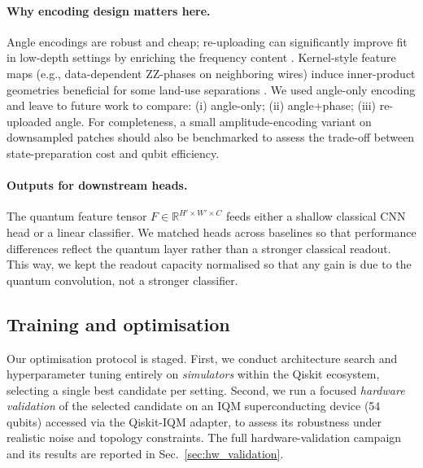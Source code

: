\paragraph{Why encoding design matters here.}
Angle encodings are robust and cheap; re-uploading can significantly improve fit in low-depth settings by enriching the frequency content \cite{PerezSalinas2020,Schuld2020Expressivity}. Kernel-style feature maps (e.g., data-dependent ZZ-phases on neighboring wires) induce inner-product geometries beneficial for some land-use separations \cite{Havlicek2019}. We used angle-only encoding and leave to future work to compare: (i) angle-only; (ii) angle+phase; (iii) re-uploaded angle. For completeness, a small amplitude-encoding variant on downsampled patches should also be benchmarked to assess the trade-off between state-preparation cost and qubit efficiency.

\paragraph{Outputs for downstream heads.}
The quantum feature tensor $F\in\mathbb{R}^{H'\times W'\times C}$ feeds either a shallow classical CNN head or a linear classifier. We matched heads across baselines so that performance differences reflect the quantum layer rather than a stronger classical readout. This way, we kept the readout capacity normalised so that any gain is due to the quantum convolution, not a stronger classifier.


\subsection{Training and optimisation}\label{sec:train-opt}
Our optimisation protocol is staged. First, we conduct architecture search and hyperparameter tuning entirely on \emph{simulators} within the Qiskit ecosystem, selecting a single best candidate per setting. Second, we run a focused \emph{hardware validation} of the selected candidate on an IQM superconducting device (54 qubits) accessed via the Qiskit-IQM adapter, to assess its robustness under realistic noise and topology constraints. The full hardware-validation campaign and its results are reported in Sec.~\ref{sec:hw_validation}.

